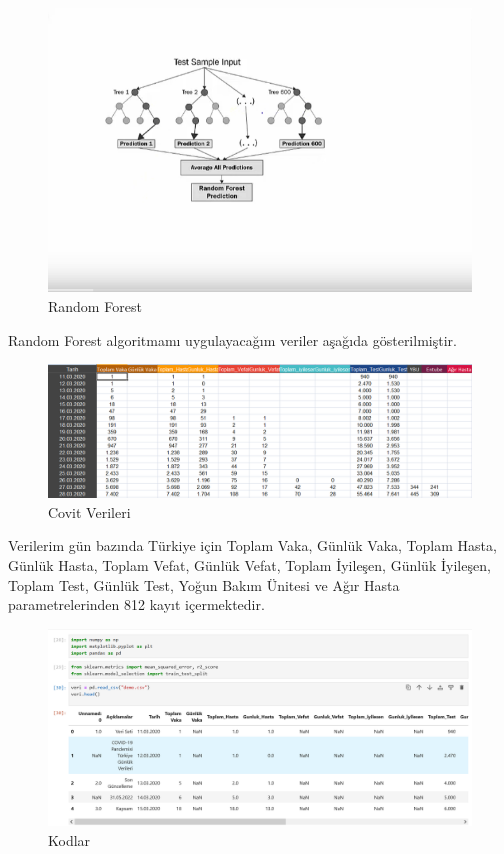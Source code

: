 \documentclass[12pt, a4paper]{article}
\begin{document}
\begin{figure}[!htbp] 
	\caption{ Random Forest }
	\centering
	\includegraphics[angle=0, width=\textwidth]{resim6.png}
	
\end{figure} 




\maketitle

Random Forest algoritmamı uygulayacağım veriler aşağıda gösterilmiştir.
\begin{figure}[!htbp] 
	\caption{Covit Verileri}
	\centering
	\includegraphics[angle=0, width=\textwidth]{4.0.png}
	
\end{figure} 
\newline
Verilerim gün bazında Türkiye için Toplam Vaka, Günlük Vaka, Toplam Hasta, Günlük Hasta, Toplam Vefat, Günlük Vefat, Toplam İyileşen, Günlük İyileşen, Toplam Test, Günlük Test, Yoğun Bakım Ünitesi ve Ağır Hasta parametrelerinden 812 kayıt içermektedir.

\begin{figure}[!htbp] 
	\caption{Kodlar}
	\centering
	\includegraphics[angle=0, width=\textwidth]{5.0.png}
	
\end{figure} 
\end{document}
